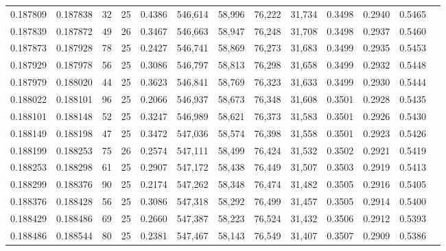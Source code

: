 \begin{tabular}{rrrrrrrrrrrrr}
0.187809 & 0.187838 &    32 &  25 &                                     0.4386 & 546,614 &  58,996 &  76,222 &  31,734 & 0.3498 & 0.2940 & 0.5465 \\
0.187839 & 0.187872 &    49 &  26 &                                     0.3467 & 546,663 &  58,947 &  76,248 &  31,708 & 0.3498 & 0.2937 & 0.5460 \\
0.187873 & 0.187928 &    78 &  25 &                                     0.2427 & 546,741 &  58,869 &  76,273 &  31,683 & 0.3499 & 0.2935 & 0.5453 \\
0.187929 & 0.187978 &    56 &  25 &                                     0.3086 & 546,797 &  58,813 &  76,298 &  31,658 & 0.3499 & 0.2932 & 0.5448 \\
0.187979 & 0.188020 &    44 &  25 &                                     0.3623 & 546,841 &  58,769 &  76,323 &  31,633 & 0.3499 & 0.2930 & 0.5444 \\
0.188022 & 0.188101 &    96 &  25 &                                     0.2066 & 546,937 &  58,673 &  76,348 &  31,608 & 0.3501 & 0.2928 & 0.5435 \\
0.188101 & 0.188148 &    52 &  25 &                                     0.3247 & 546,989 &  58,621 &  76,373 &  31,583 & 0.3501 & 0.2926 & 0.5430 \\
0.188149 & 0.188198 &    47 &  25 &                                     0.3472 & 547,036 &  58,574 &  76,398 &  31,558 & 0.3501 & 0.2923 & 0.5426 \\
0.188199 & 0.188253 &    75 &  26 &                                     0.2574 & 547,111 &  58,499 &  76,424 &  31,532 & 0.3502 & 0.2921 & 0.5419 \\
0.188253 & 0.188298 &    61 &  25 &                                     0.2907 & 547,172 &  58,438 &  76,449 &  31,507 & 0.3503 & 0.2919 & 0.5413 \\
0.188299 & 0.188376 &    90 &  25 &                                     0.2174 & 547,262 &  58,348 &  76,474 &  31,482 & 0.3505 & 0.2916 & 0.5405 \\
0.188376 & 0.188428 &    56 &  25 &                                     0.3086 & 547,318 &  58,292 &  76,499 &  31,457 & 0.3505 & 0.2914 & 0.5400 \\
0.188429 & 0.188486 &    69 &  25 &                                     0.2660 & 547,387 &  58,223 &  76,524 &  31,432 & 0.3506 & 0.2912 & 0.5393 \\
0.188486 & 0.188544 &    80 &  25 &                                     0.2381 & 547,467 &  58,143 &  76,549 &  31,407 & 0.3507 & 0.2909 & 0.5386 \\

\end{tabular}
